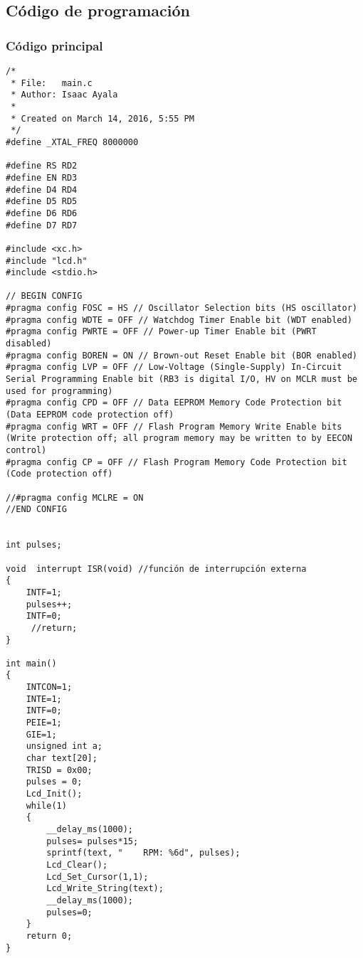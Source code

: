 \subsection{C\'odigo de programaci\'on}
\subsubsection{C\'odigo principal}
\begin{lstlisting}
/*
 * File:   main.c
 * Author: Isaac Ayala
 *
 * Created on March 14, 2016, 5:55 PM
 */
#define _XTAL_FREQ 8000000

#define RS RD2
#define EN RD3
#define D4 RD4
#define D5 RD5
#define D6 RD6
#define D7 RD7

#include <xc.h>
#include "lcd.h"
#include <stdio.h>

// BEGIN CONFIG
#pragma config FOSC = HS // Oscillator Selection bits (HS oscillator)
#pragma config WDTE = OFF // Watchdog Timer Enable bit (WDT enabled)
#pragma config PWRTE = OFF // Power-up Timer Enable bit (PWRT disabled)
#pragma config BOREN = ON // Brown-out Reset Enable bit (BOR enabled)
#pragma config LVP = OFF // Low-Voltage (Single-Supply) In-Circuit Serial Programming Enable bit (RB3 is digital I/O, HV on MCLR must be used for programming)
#pragma config CPD = OFF // Data EEPROM Memory Code Protection bit (Data EEPROM code protection off)
#pragma config WRT = OFF // Flash Program Memory Write Enable bits (Write protection off; all program memory may be written to by EECON control)
#pragma config CP = OFF // Flash Program Memory Code Protection bit (Code protection off)

//#pragma config MCLRE = ON
//END CONFIG


int pulses;

void  interrupt ISR(void) //función de interrupción externa
{
    INTF=1;
    pulses++;
    INTF=0;
     //return;
}

int main()
{
    INTCON=1;
    INTE=1;
    INTF=0;
    PEIE=1;
    GIE=1;
    unsigned int a;
    char text[20];
    TRISD = 0x00;
    pulses = 0;
    Lcd_Init();
    while(1)
    {
        __delay_ms(1000);
        pulses= pulses*15;
        sprintf(text, "    RPM: %6d", pulses);
        Lcd_Clear();
        Lcd_Set_Cursor(1,1);
        Lcd_Write_String(text);
        __delay_ms(1000);
        pulses=0;
    }
    return 0;
}
\end{lstlisting}


